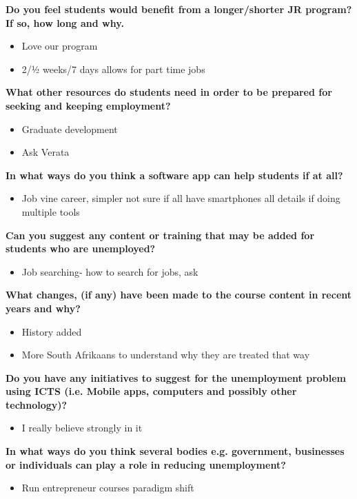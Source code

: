 \noindent\textbf{Do you feel students would benefit from a longer/shorter JR program? If so, how long and why.}
\begin{itemize}
\item Love our program
\item 2/½ weeks/7 days allows for part time jobs
\end{itemize}

\noindent\textbf{What other resources do students need in order to be prepared for seeking and keeping employment?}
\begin{itemize}
\item Graduate development
\item Ask Verata
\end{itemize}

\noindent\textbf{In what ways do you think a software app can help students if at all?}
\begin{itemize}
\item Job vine career, simpler not sure if all have smartphones all details if doing multiple tools
\end{itemize}

\noindent\textbf{Can you suggest any content or training that may be added for students who are unemployed?}
\begin{itemize}
\item Job searching- how to search for jobs, ask
\end{itemize}

\noindent\textbf{What changes, (if any) have been made to the course content in recent years and why?}
\begin{itemize}
\item History added
\item More South Afrikaans to understand why they are treated that way
\end{itemize}



\noindent\textbf{Do you have any initiatives to suggest for the unemployment problem using ICTS (i.e. Mobile apps, computers and possibly other technology)?}
\begin{itemize}
\item I really believe strongly in it
\end{itemize}

\noindent\textbf{In what ways do you think several bodies e.g. government, businesses or individuals can play a role in reducing unemployment?}
\begin{itemize}
\item Run entrepreneur courses paradigm shift
\end{itemize}

